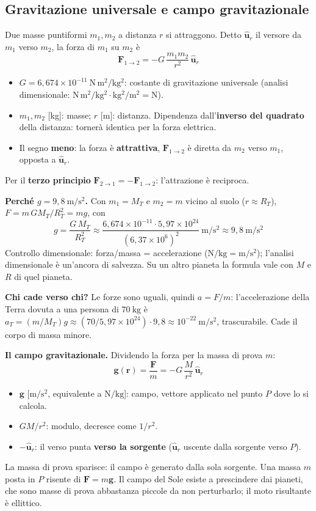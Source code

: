 \documentclass[11pt,a4paper]{article}
\newcommand{\vv}[1]{\mathbf{#1}}
\newcommand{\ur}{\hat{\mathbf{u}}_r}
\newcommand{\unit}[1]{\ \mathrm{#1}}
\begin{document}
\subsection{Gravitazione universale e campo gravitazionale}
Due masse puntiformi $m_1,m_2$ a distanza $r$ si attraggono. Detto $\ur$ il versore da $m_1$ verso $m_2$, la forza di $m_1$ su $m_2$ è
\begin{equation}
\vv F_{1\to2}=-G\,\frac{m_1m_2}{r^{2}}\,\ur
\end{equation}
\begin{itemize}[nosep]
\item $G=6{,}674\times10^{-11}\unit{N\,m^2/kg^2}$: costante di gravitazione universale (analisi dimensionale: $\mathrm{N\,m^2/kg^2\cdot kg^2/m^2=N}$).
\item $m_1,m_2$ [kg]: masse; $r$ [m]: distanza. Dipendenza dall'\textbf{inverso del quadrato} della distanza: tornerà identica per la forza elettrica.
\item Il segno \textbf{meno}: la forza è \textbf{attrattiva}, $\vv F_{1\to2}$ è diretta da $m_2$ verso $m_1$, opposta a $\ur$.
\end{itemize}
Per il \textbf{terzo principio} $\vv F_{2\to1}=-\vv F_{1\to2}$: l'attrazione è reciproca.

\textbf{Perché $g=9{,}8\unit{m/s^2}$.} Con $m_1=M_T$ e $m_2=m$ vicino al suolo ($r\approx R_T$), $F=m\,GM_T/R_T^2=mg$, con
\begin{equation}
g=\frac{G\,M_T}{R_T^{2}}\approx\frac{6{,}674\times10^{-11}\cdot5{,}97\times10^{24}}{(6{,}37\times10^{6})^{2}}\unit{m/s^2}\approx9{,}8\unit{m/s^2}
\end{equation}
Controllo dimensionale: forza/massa = accelerazione ($\mathrm{N/kg=m/s^2}$); l'analisi dimensionale è un'ancora di salvezza. Su un altro pianeta la formula vale con $M$ e $R$ di quel pianeta.

\textbf{Chi cade verso chi?} Le forze sono uguali, quindi $a=F/m$: l'accelerazione della Terra dovuta a una persona di $70\unit{kg}$ è $a_T=(m/M_T)g\approx(70/5{,}97\times10^{24})\cdot9{,}8\approx10^{-22}\unit{m/s^2}$, trascurabile. Cade il corpo di massa minore.

\textbf{Il campo gravitazionale.} Dividendo la forza per la massa di prova $m$:
\begin{equation}
\vv g(\vv r)=\frac{\vv F}{m}=-G\,\frac{M}{r^{2}}\,\ur
\end{equation}
\begin{itemize}[nosep]
\item $\vv g$ [$\mathrm{m/s^2}$, equivalente a $\mathrm{N/kg}$]: campo, vettore applicato nel punto $P$ dove lo si calcola.
\item $GM/r^2$: modulo, decresce come $1/r^2$.
\item $-\ur$: il verso punta \textbf{verso la sorgente} ($\ur$ uscente dalla sorgente verso $P$).
\end{itemize}
La massa di prova \guillemotleft sparisce\guillemotright: il campo è generato dalla sola sorgente. Una massa $m$ posta in $P$ risente di $\vv F=m\vv g$. Il campo del Sole esiste a prescindere dai pianeti, che sono masse di prova abbastanza piccole da non perturbarlo; il moto risultante è ellittico.
\end{document}
